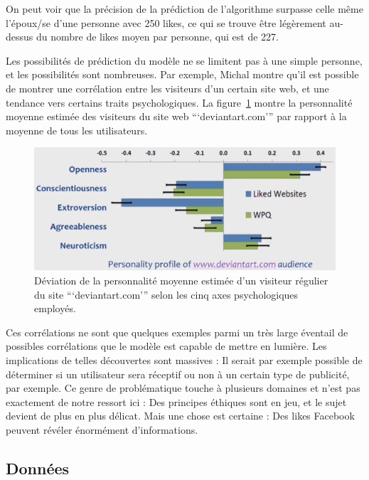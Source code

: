 		On peut voir que la précision de la prédiction de l'algorithme surpasse celle même l'époux/se d'une personne avec 250 likes, ce qui se trouve être légèrement au-dessus du nombre de likes moyen par personne, qui est de 227.

		Les possibilités de prédiction du modèle ne se limitent pas à une simple personne, et les possibilités sont nombreuses. Par exemple, Michal montre qu'il est possible de montrer une corrélation entre les visiteurs d'un certain site web, et une tendance vers certains traits psychologiques. La figure~\ref{a-talk2} montre la personnalité moyenne estimée des visiteurs du site web ```deviantart.com''' par rapport à la moyenne de tous les utilisateurs.

		\begin{figure}[ht]
			\centering
			\includegraphics[width=1\textwidth]{images/analysis/talk2}
			\caption{Déviation de la personnalité moyenne estimée d'un visiteur régulier du site ```deviantart.com''' selon les cinq axes psychologiques employés\cite{kosinski-talk}.}
			\label{a-talk2}
		\end{figure}

		Ces corrélations ne sont que quelques exemples parmi un très large éventail de possibles corrélations que le modèle est capable de mettre en lumière. Les implications de telles découvertes sont massives : Il serait par exemple possible de déterminer si un utilisateur sera réceptif ou non à un certain type de publicité, par exemple. Ce genre de problématique touche à plusieurs domaines et n'est pas exactement de notre ressort ici : Des principes éthiques sont en jeu, et le sujet devient de plus en plus délicat. Mais une chose est certaine : Des likes Facebook peuvent révéler énormément d'informations.

	\subsection{Données}

